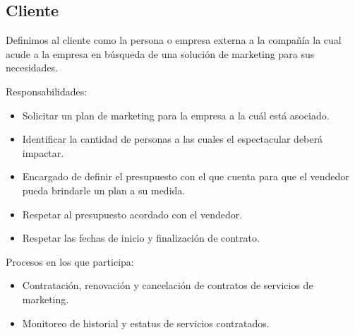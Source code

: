 \newpage
\begin{Usuario}{\subsection{Cliente}}{
   Definimos al cliente como la persona o empresa externa a la compañía la cual acude a la empresa en búsqueda de una solución de marketing para sus necesidades.\\
   
}
    \item[Responsabilidades:]\cdtEmpty 
   \begin{itemize}
       \item Solicitar un plan de marketing para la empresa a la cuál está asociado.
       \item Identificar la cantidad de personas a las cuales el espectacular deberá impactar.
       \item Encargado de definir el presupuesto con el que cuenta para que el vendedor pueda brindarle un plan a su medida.
       \item Respetar al presupuesto acordado con el vendedor.
	   \item Respetar las fechas de inicio y finalización de contrato.
   \end{itemize}
	\item[Procesos en los que participa:] \cdtEmpty
    \begin{itemize}
		\item Contratación, renovación y cancelación de contratos de servicios de marketing.
	    \item Monitoreo de historial y estatus de servicios contratados.
    \end{itemize}
\end{Usuario}


